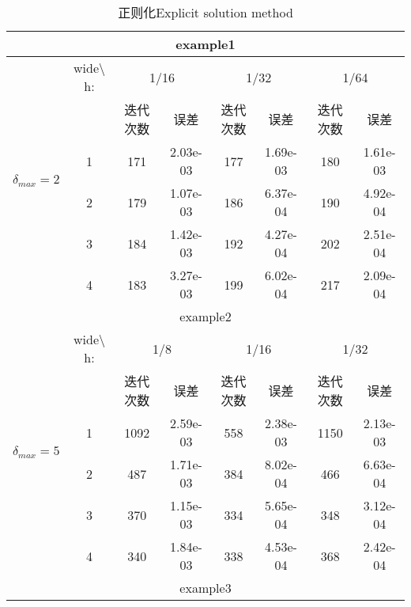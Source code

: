 \documentclass[11pt]{article}
\begin{document}
\begin{table}[ht!]
\centering
\caption{正则化Explicit solution method}
\label{table}
    \begin{tabular}{  c| c|c c|c c| c c }
          \hline      
  \hline
  
\hline



    \hline     
    \hline
    \multicolumn{8}{c}{example1}\\
         \hline      
  \hline
  
\hline



    \hline     
    \hline   
    \multirow{6}{*}{$\delta_{max}=2$}
   &wide$\setminus$  h:	&\multicolumn{2}{|c|}{1/16}&\multicolumn{2}{|c|}{1/32}&\multicolumn{2}{|c}{1/64}\\
&	&迭代次数	&误差	&迭代次数	&误差  &迭代次数	&误差		\\
&1&171	&2.03e-03	&177	&1.69e-03	&180	&1.61e-03\\
&2&179	&1.07e-03	&186	&6.37e-04	&190	&4.92e-04\\
&3&184	&1.42e-03	&192	&4.27e-04	&202	&2.51e-04\\
&4&183	&3.27e-03	&199	&6.02e-04	&217	&2.09e-04\\      \hline      
  \hline
  
\hline



    \hline     
    \hline
    \multicolumn{8}{c}{example2}\\
         \hline      
  \hline
  
\hline



    \hline     
    \hline
    \multirow{6}{*}{$\delta_{max}=5$}
   &wide$\setminus$  h:	&\multicolumn{2}{|c|}{1/8}&\multicolumn{2}{|c|}{1/16}&\multicolumn{2}{|c}{1/32}\\
&	&迭代次数	&误差	&迭代次数	&误差  &迭代次数	&误差		\\
&1&1092	&2.59e-03	&558	&2.38e-03	&1150	&2.13e-03\\
&2&487	&1.71e-03	&384	&8.02e-04	&466	&6.63e-04\\
&3&370	&1.15e-03	&334	&5.65e-04	&348	&3.12e-04\\
&4&340	&1.84e-03	&338	&4.53e-04	&368	&2.42e-04\\
        \hline      
  \hline
  
\hline




    \hline     
    \hline
    \multicolumn{8}{c}{example3}\\
         \hline      
  \hline
  

\end{tabular}
\end{table}
\end{document}

